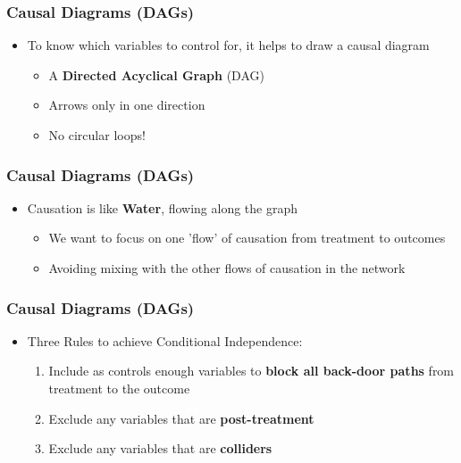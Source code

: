 \documentclass[xcolor=x11names,compress]{beamer}\usepackage[]{graphicx}\usepackage[]{color}
\renewcommand{\(}{\begin{columns}}
\renewcommand{\)}{\end{columns}}
\newcommand{\<}[1]{\begin{column}{#1}}
\renewcommand{\>}{\end{column}}
\begin{document}
\begin{frame}
\frametitle{Causal Diagrams (DAGs)}
\begin{itemize}
\item To know which variables to control for, it helps to draw a causal diagram
\pause
\begin{itemize}
\item A \textbf{Directed Acyclical Graph} (DAG)
\pause
\item Arrows only in one direction
\pause
\item No circular loops!
\end{itemize}
\end{itemize}
\end{frame}

\begin{frame}
\frametitle{Causal Diagrams (DAGs)}
\begin{itemize}
\item Causation is like \textbf{Water}, flowing along the graph
\begin{itemize}
\item We want to focus on one 'flow' of causation from treatment to outcomes
\pause
\item Avoiding mixing with the other flows of causation in the network
\end{itemize}
\end{itemize}
\end{frame}

\begin{frame}
\frametitle{Causal Diagrams (DAGs)}
\begin{itemize}
\item Three Rules to achieve Conditional Independence:
\begin{enumerate}
\item Include as controls enough variables to \textbf{block all back-door paths} from treatment to the outcome
\pause
\item Exclude any variables that are \textbf{post-treatment}
\pause
\item Exclude any variables that are \textbf{colliders}
\end{enumerate}
\end{itemize}
\end{frame}
\end{document}
